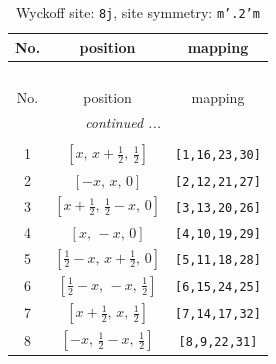 \documentclass[fleqn,8pt]{jsarticle}
\begin{document}
\begin{longtable}{ccc}
\caption{Wyckoff site: {\tt 8j}, site symmetry: {\tt m'.2'm}}
 \\
 \hline \hline
No. & position & mapping \\ \hline \endfirsthead

\multicolumn{2}{l}{\tablename\ \thetable{}} \\
 \hline \hline
No. & position & mapping \\ \hline \endhead

 \hline \hline
\multicolumn{2}{r}{\footnotesize\it continued ...} \\ \endfoot

 \hline \hline
\multicolumn{2}{r}{} \\ \endlastfoot

1 & $\left[ x,\, x + \frac{1}{2},\, \frac{1}{2} \right]$ & {\tt [1,16,23,30]} \\ \hline
2 & $\left[ - x,\, x,\, 0 \right]$ & {\tt [2,12,21,27]} \\ \hline
3 & $\left[ x + \frac{1}{2},\, \frac{1}{2} - x,\, 0 \right]$ & {\tt [3,13,20,26]} \\ \hline
4 & $\left[ x,\, - x,\, 0 \right]$ & {\tt [4,10,19,29]} \\ \hline
5 & $\left[ \frac{1}{2} - x,\, x + \frac{1}{2},\, 0 \right]$ & {\tt [5,11,18,28]} \\ \hline
6 & $\left[ \frac{1}{2} - x,\, - x,\, \frac{1}{2} \right]$ & {\tt [6,15,24,25]} \\ \hline
7 & $\left[ x + \frac{1}{2},\, x,\, \frac{1}{2} \right]$ & {\tt [7,14,17,32]} \\ \hline
8 & $\left[ - x,\, \frac{1}{2} - x,\, \frac{1}{2} \right]$ & {\tt [8,9,22,31]} \\
\end{longtable}
\renewcommand{\arraystretch}{1.2}
\end{document}
